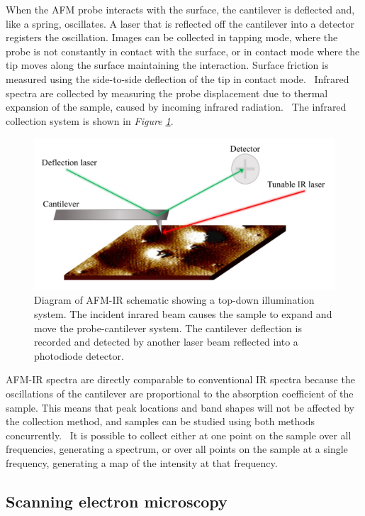 When the AFM probe interacts with the surface, the cantilever is deflected and, like a spring, oscillates. A laser that is reflected off the cantilever into a detector registers the oscillation. Images can be collected in tapping mode, where the probe is not constantly in contact with the surface, or in contact mode where the tip moves along the surface maintaining the interaction. Surface friction is measured using the side-to-side deflection of the tip in contact mode.~\autocite{friction_afm} Infrared spectra are collected by measuring the probe displacement due to thermal expansion of the sample, caused by incoming infrared radiation.~\autocite{dazzi2017,kurouski} The infrared collection system is shown in \textit{Figure \ref{fig:afm_diagram}}.


\begin{figure}[H]
\centering
  \includegraphics[width=\linewidth]{afm_diagram}
\caption[Diagram of AFM-IR schematic showing a top-down illumination system.]{Diagram of AFM-IR schematic showing a top-down illumination system. The incident inrared beam causes the sample to expand and move the probe-cantilever system. The cantilever deflection is recorded and detected by another laser beam reflected into a photodiode detector.~\autocite{Morsch,dazzi2017}}
\label{fig:afm_diagram}
\end{figure}

AFM-IR spectra are directly comparable to conventional IR spectra because the oscillations of the cantilever are proportional to the absorption coefficient of the sample. This means that peak locations and band shapes will not be affected by the collection method, and samples can be studied using both methods concurrently.~\autocite{dazzi2017,kurouski} It is possible to collect either at one point on the sample over all frequencies, generating a spectrum, or over all points on the sample at a single frequency, generating a map of the intensity at that frequency. 

\subsection[Scanning electron microscopy]{Scanning electron microscopy}
\label{subsection1.2.2}




